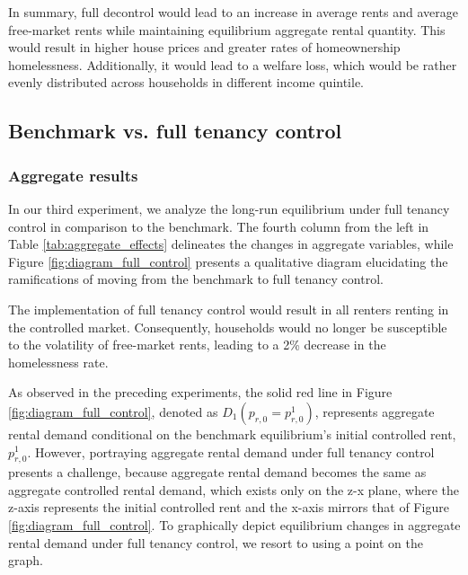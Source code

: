 \documentclass[parskip=full]{article}
\begin{document}
In summary, full decontrol would lead to an increase in average rents and average free-market rents while maintaining equilibrium aggregate rental quantity. This would result in higher house prices and greater rates of homeownership homelessness. Additionally, it would lead to a welfare loss, which would be rather evenly distributed across households in different income quintile. 

\subsection{Benchmark vs. full tenancy control}\label{subsection:full_control}

\subsubsection{Aggregate results}

In our third experiment, we analyze the long-run equilibrium under full tenancy control in comparison to the benchmark. The fourth column from the left in Table \ref{tab:aggregate_effects} delineates the changes in aggregate variables, while Figure \ref{fig:diagram_full_control} presents a qualitative diagram elucidating the ramifications of moving from the benchmark to full tenancy control.

The implementation of full tenancy control would result in all renters renting in the controlled market. Consequently, households would no longer be susceptible to the volatility of free-market rents, leading to a 2\% decrease in the homelessness rate.

As observed in the preceding experiments, the solid red line in Figure \ref{fig:diagram_full_control}, denoted as $D_{1}(p_{r,0}=p^{1}_{r,0})$, represents aggregate rental demand conditional on the benchmark equilibrium's initial controlled rent, $p^{1}_{r,0}$. However, portraying aggregate rental demand under full tenancy control presents a challenge, because aggregate rental demand becomes the same as aggregate controlled rental demand, which exists only on the z-x plane, where the z-axis represents the initial controlled rent and the x-axis mirrors that of Figure \ref{fig:diagram_full_control}. To graphically depict equilibrium changes in aggregate rental demand under full tenancy control, we resort to using a point on the graph.
\end{document}
